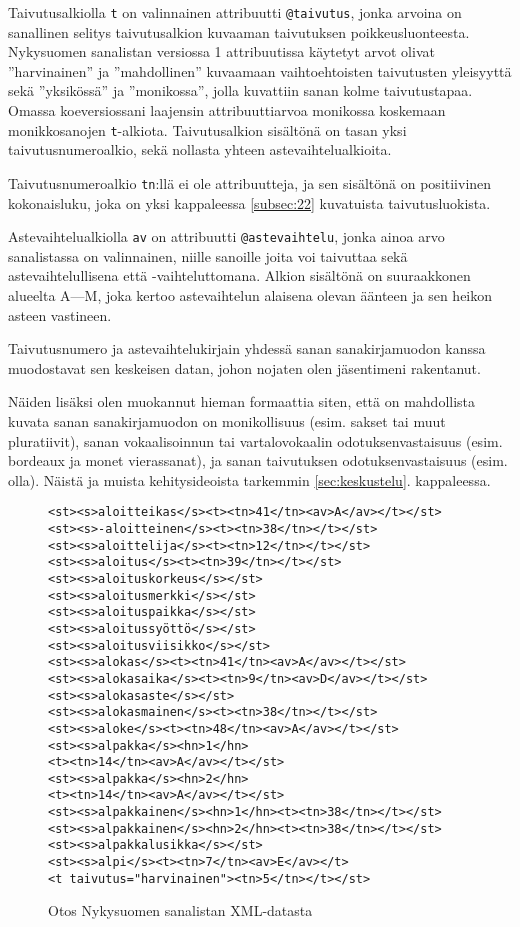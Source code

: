\documentclass[free]{flammie}
\begin{document}
Taivutusalkiolla \texttt{t} on valinnainen attribuutti \texttt{@taivutus}, jonka arvoina
on sanallinen selitys taivutusalkion kuvaaman taivutuksen poikkeusluonteesta. Nykysuomen sanalistan versiossa 1 attribuutissa käytetyt arvot olivat
”harvinainen” ja ”mahdollinen” kuvaamaan vaihtoehtoisten taivutusten
yleisyyttä sekä ”yksikössä” ja ”monikossa”, jolla kuvattiin sanan kolme
taivutustapaa. Omassa koeversiossani laajensin attribuuttiarvoa monikossa
koskemaan monikkosanojen \texttt{t}-alkiota. Taivutusalkion sisältönä on tasan yksi taivutusnumeroalkio, sekä nollasta yhteen astevaihtelualkioita.

Taivutusnumeroalkio \texttt{tn}:llä ei ole attribuutteja, ja sen sisältönä on positiivinen
kokonaisluku, joka on yksi kappaleessa \ref{subsec:22} kuvatuista taivutusluokista.

Astevaihtelualkiolla \texttt{av} on attribuutti \texttt{@astevaihtelu}, jonka ainoa arvo sanalistassa on valinnainen, niille sanoille joita voi taivuttaa sekä astevaihtelullisena että -vaihteluttomana. Alkion sisältönä on suuraakkonen alueelta A—M, joka
kertoo astevaihtelun alaisena olevan äänteen ja sen heikon asteen vastineen.

Taivutusnumero ja astevaihtelukirjain yhdessä sanan sanakirjamuodon kanssa
muodostavat sen keskeisen datan, johon nojaten olen jäsentimeni rakentanut.

Näiden lisäksi olen muokannut hieman formaattia siten, että on mahdollista kuvata sanan sanakirjamuodon on monikollisuus (esim. sakset tai muut pluratiivit),
sanan vokaalisoinnun tai vartalovokaalin odotuksenvastaisuus (esim. bordeaux ja
monet vierassanat), ja sanan taivutuksen odotuksenvastaisuus (esim. olla). Näistä
ja muista kehitysideoista tarkemmin \ref{sec:keskustelu}. kappaleessa.


\begin{figure}
    \caption{Otos Nykysuomen sanalistan XML-datasta \cite{nykysuomensanalista2006}
    \label{fig:nssl-xml}}
    \begin{verbatim}
<st><s>aloitteikas</s><t><tn>41</tn><av>A</av></t></st>
<st><s>-aloitteinen</s><t><tn>38</tn></t></st>
<st><s>aloittelija</s><t><tn>12</tn></t></st>
<st><s>aloitus</s><t><tn>39</tn></t></st>
<st><s>aloituskorkeus</s></st>
<st><s>aloitusmerkki</s></st>
<st><s>aloituspaikka</s></st>
<st><s>aloitussyöttö</s></st>
<st><s>aloitusviisikko</s></st>
<st><s>alokas</s><t><tn>41</tn><av>A</av></t></st>
<st><s>alokasaika</s><t><tn>9</tn><av>D</av></t></st>
<st><s>alokasaste</s></st>
<st><s>alokasmainen</s><t><tn>38</tn></t></st>
<st><s>aloke</s><t><tn>48</tn><av>A</av></t></st>
<st><s>alpakka</s><hn>1</hn>
<t><tn>14</tn><av>A</av></t></st>
<st><s>alpakka</s><hn>2</hn>
<t><tn>14</tn><av>A</av></t></st>
<st><s>alpakkainen</s><hn>1</hn><t><tn>38</tn></t></st>
<st><s>alpakkainen</s><hn>2</hn><t><tn>38</tn></t></st>
<st><s>alpakkalusikka</s></st>
<st><s>alpi</s><t><tn>7</tn><av>E</av></t>
<t taivutus="harvinainen"><tn>5</tn></t></st>
    \end{verbatim}
\end{figure}
\end{document}
